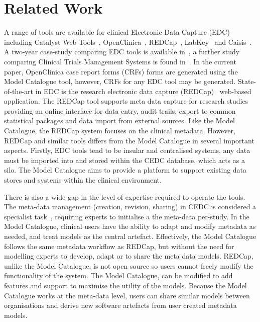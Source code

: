 
\section{Related Work}

A range of tools are available for clinical Electronic Data Capture (EDC) including Catalyst Web Tools~\cite{catalyst}, OpenClinica~\cite{oc}, REDCap~\cite{harr09}, LabKey~\cite{labk} and Caisis~\cite{cais}. A two-year case-study comparing EDC tools is available in~\cite{fran11}, a further study comparing Clinical Trials Management Systems is found in~\cite{lero11}. In the current paper, OpenClinica case report forms (CRFs) forms are generated using the Model Catalogue tool, however, CRFs for any EDC tool may be generated. State-of-the-art in EDC is the research electronic data capture (REDCap)~\cite{harr09} web-based application. The REDCap tool supports meta data capture for research studies providing an online interface for data entry, audit trails, export to common statistical packages and data import from external sources. Like the Model Catalogue, the REDCap system focuses on the clinical metadata. However, REDCap and similar tools differs from the Model Catalogue in several important aspects. Firstly, EDC tools tend to be insular and centralised systems, any data must be imported into and stored within the CEDC database, which acts as a silo. The Model Catalogue aims to provide a platform to support existing data stores and systems within the clinical environment. 

There is also a wide-gap in the level of expertise required to operate the tools. The meta-data management (creation, revision, sharing) in CEDC is considered a specialist task~\cite{harr09,fran11}, requiring experts to initialise a the meta-data per-study. In the Model Catalogue, clinical users have the ability to adapt and modify metadata as needed, and treat models as the central artefact. Effectively, the Model Catalogue follows the same metadata workflow as REDCap, but without the need for modelling experts to develop, adapt or to share the meta data models. REDCap, unlike the Model Catalogue, is not open source so users cannot freely modify the functionality of the system. The Model Catalogue, can be modified to add features and support to maximise the utility of the models. Because the Model Catalogue works at the meta-data level, users can share similar models between organisations and derive new software artefacts from user created metadata models.

